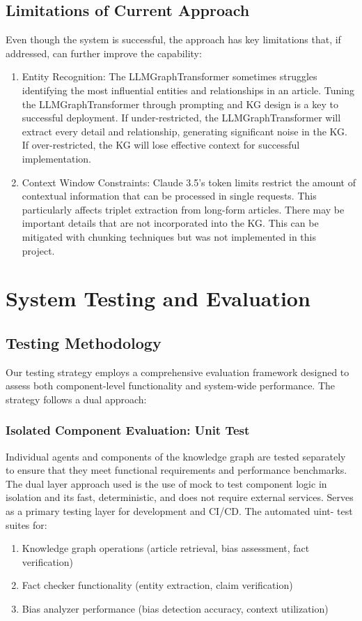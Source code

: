 \documentclass{scrartcl}
\begin{document}
\subsection{Limitations of Current Approach}
Even though the system is successful, the approach has key limitations that, if addressed, can further improve the capability:
\begin{enumerate}
    \item Entity Recognition: The LLMGraphTransformer sometimes struggles identifying the most influential entities and relationships in an article. Tuning the LLMGraphTransformer through prompting and KG design is a key to successful deployment. If under-restricted, the LLMGraphTransformer will extract every detail and relationship, generating significant noise in the KG. If over-restricted, the KG will lose effective context for successful implementation.
    \item Context Window Constraints: Claude 3.5’s token limits restrict the amount of contextual information that can be processed in single requests. This particularly affects triplet extraction from long-form articles. There may be important details that are not incorporated into the KG. This can be mitigated with chunking techniques but was not implemented in this project. 
\end{enumerate}

\section{System Testing and Evaluation}
\subsection{Testing Methodology}
Our testing strategy employs a comprehensive evaluation framework designed to assess both component-level functionality and system-wide performance. The strategy follows a dual approach:
\subsubsection{Isolated Component Evaluation: Unit Test}
Individual agents and components of the knowledge graph are tested separately to ensure that they meet functional requirements and performance benchmarks. The dual layer approach used is the use of mock to test component logic in isolation and its fast, deterministic, and does not require external services. Serves as a primary testing layer for development and CI/CD. The automated uint- test suites for:
\begin{enumerate}
    \item Knowledge graph operations (article retrieval, bias assessment, fact verification)
    \item Fact checker functionality (entity extraction, claim verification)
    \item Bias analyzer performance (bias detection accuracy, context utilization)

\end{enumerate}
\end{document}
